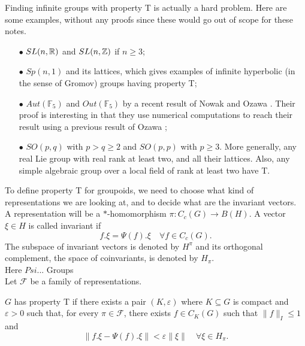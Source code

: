 Finding infinite groups with property T is actually a hard problem. Here are some examples, without any proofs since these would go out of scope for these notes.\\
\begin{itemize}
\item[$\bullet$] $SL(n,\mathbb R)$ and $SL(n,\mathbb Z)$ if $n\geq 3$;\\
\item[$\bullet$] $Sp(n,1)$ and its lattices, which gives examples of infinite hyperbolic (in the sense of Gromov) groups having property T;\\
\item[$\bullet$] $Aut(\mathbb{F}_5)$ and $Out(\mathbb{F}_5)$ by a recent result of Nowak and Ozawa \cite{NowakOzawa}. Their proof is interesting in that they use numerical computations to reach their result using a previous result of Ozawa \cite{OzawaT};\\
\item[$\bullet$] $SO(p,q)$ with $p> q \geq 2$ and $SO(p,p)$ with $p \geq 3$. More generally, any real Lie group with real rank at least two, and all their lattices. Also, any simple algebraic group over a local field of rank at least two have T.\\ 
\end{itemize} 

To define property T for groupoids, we need to choose what kind of representations we are looking at, and to decide what are the invariant vectors.\\

A representation will be a $*$-homomorphism $\pi : C_c(G)\rightarrow B(H)$. A vector $\xi\in H $ is called invariant if \[f.\xi = \Psi(f).\xi \quad \forall f\in C_c(G).\]
The subspace of invariant vectors is denoted by $H^\pi$ and its orthogonal complement, the space of coinvariants, is denoted by $H_\pi$.\\

Here $Psi$... Groups\\

Let $\mathcal{F}$ be a family of representations.
\begin{definition}
$G$ has property T if there exists a pair $(K,\varepsilon)$ where $K\subseteq G$ is compact and $\varepsilon>0$ such that, for every $\pi \in \mathcal{F}$, there exists $f\in C_K(G)$ such that $\| f\|_I \leq 1$ and 
\[\|f .\xi - \Psi (f).\xi \| < \varepsilon \| \xi\| \quad \forall \xi \in H_\pi. \]
\end{definition}
 
